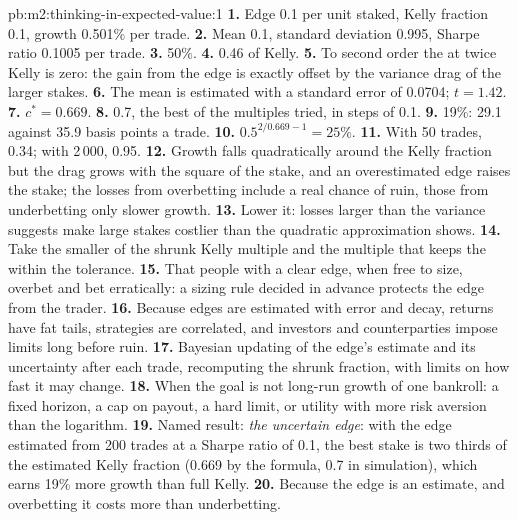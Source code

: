 \begin{solution}{pb:m2:thinking-in-expected-value:1}
\textbf{1.} Edge 0.1 per unit staked, Kelly fraction 0.1, growth 0.501\% per trade.
\textbf{2.} Mean 0.1, standard deviation 0.995, Sharpe ratio 0.1005 per trade.
\textbf{3.} 50\%.
\textbf{4.} 0.46 of Kelly.
\textbf{5.} To second order the  at twice Kelly is zero: the gain from the edge
is exactly offset by the variance drag of the larger stakes.
\textbf{6.} The mean is estimated with a standard error of 0.0704; $t = 1.42$.
\textbf{7.} $c^* = 0.669$.
\textbf{8.} 0.7, the best of the multiples tried, in steps of 0.1.
\textbf{9.} 19\%: 29.1 against 35.9 basis points a trade.
\textbf{10.} $0.5^{2/0.669 - 1} = 25\%$.
\textbf{11.} With 50 trades, 0.34; with 2\,000, 0.95.
\textbf{12.} Growth falls quadratically around the Kelly fraction but the drag grows with
the square of the stake, and an overestimated edge raises the stake; the losses from
overbetting include a real chance of ruin, those from underbetting only slower growth.
\textbf{13.} Lower it: losses larger than the variance suggests make large stakes costlier
than the quadratic approximation shows.
\textbf{14.} Take the smaller of the shrunk Kelly multiple and the multiple that keeps the
 within the tolerance.
\textbf{15.} That people with a clear edge, when free to size, overbet and bet erratically:
a sizing rule decided in advance protects the edge from the trader.
\textbf{16.} Because edges are estimated with error and decay, returns have fat tails,
strategies are correlated, and investors and counterparties impose  limits long
before ruin.
\textbf{17.} Bayesian updating of the edge's estimate and its uncertainty after each
trade, recomputing the shrunk fraction, with limits on how fast it may change.
\textbf{18.} When the goal is not long-run growth of one bankroll: a fixed horizon, a cap
on payout, a hard  limit, or utility with more risk aversion than the logarithm.
\textbf{19.} Named result: \emph{the uncertain edge}: with the edge estimated from 200 trades
at a Sharpe ratio of 0.1, the best stake is two thirds of the estimated Kelly fraction
(0.669 by the formula, 0.7 in simulation), which earns 19\% more growth than full Kelly.
\textbf{20.} Because the edge is an estimate, and overbetting it costs more than
underbetting.
\end{solution}

